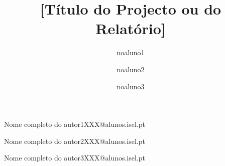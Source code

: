 \def\thetitle{%
 [Título do Projecto ou do Relatório]
}
\def\theauthor{%
 [Acrónimo dos alunos]
}

\title{ \thetitle }

\author{noaluno1}{Nome completo do autor1}{XXX@alunos.isel.pt}
\author{noaluno2}{Nome completo do autor2}{XXX@alunos.isel.pt}
\author{noaluno3}{Nome completo do autor3}{XXX@alunos.isel.pt}



